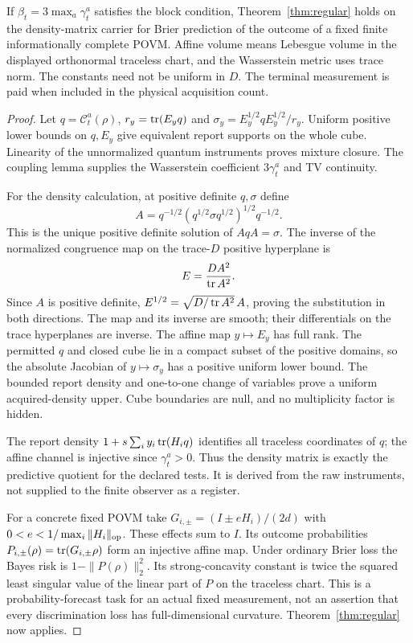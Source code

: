 \begin{theorem}\label{thm:quantum}
If $\beta_t=3\max_a\gamma_t^a$ satisfies the block condition, Theorem~\ref{thm:regular} holds on the density-matrix carrier for Brier prediction of the outcome of a fixed finite informationally complete POVM. Affine volume means Lebesgue volume in the displayed orthonormal traceless chart, and the Wasserstein metric uses trace norm. The constants need not be uniform in $D$. The terminal measurement is paid when included in the physical acquisition count.
\end{theorem}
\begin{proof}
Let $q=\mathcal C_t^a(\rho)$, $r_y=\operatorname{tr}(E_yq)$ and
$\sigma_y=E_y^{1/2}qE_y^{1/2}/r_y$. Uniform positive lower bounds on $q,E_y$ give equivalent report supports on the whole cube. Linearity of the unnormalized quantum instruments proves mixture closure. The coupling lemma supplies the Wasserstein coefficient $3\gamma_t^a$ and TV continuity.

For the density calculation, at positive definite $q,\sigma$ define
\[
 A=q^{-1/2}(q^{1/2}\sigma q^{1/2})^{1/2}q^{-1/2}.
\]
This is the unique positive definite solution of $AqA=\sigma$. The inverse of the normalized congruence map on the trace-$D$ positive hyperplane is
\begin{equation}\label{eq:quantum_inverse}
 E=\frac{DA^2}{\operatorname{tr} A^2}.
\end{equation}
Since $A$ is positive definite, $E^{1/2}=\sqrt{D/\operatorname{tr} A^2}\,A$, proving the substitution in both directions. The map and its inverse are smooth; their differentials on the trace hyperplanes are inverse. The affine map $y\mapsto E_y$ has full rank. The permitted $q$ and closed cube lie in a compact subset of the positive domains, so the absolute Jacobian of $y\mapsto\sigma_y$ has a positive uniform lower bound. The bounded report density and one-to-one change of variables prove a uniform acquired-density upper. Cube boundaries are null, and no multiplicity factor is hidden.

The report density $1+s\sum_i y_i\operatorname{tr}(H_iq)$ identifies all traceless coordinates of $q$; the affine channel is injective since $\gamma_t^a>0$. Thus the density matrix is exactly the predictive quotient for the declared tests. It is derived from the raw instruments, not supplied to the finite observer as a register.

For a concrete fixed POVM take
$G_{i,\pm}=(I\pm eH_i)/(2d)$ with
$0<e<1/\max_i\|H_i\|_{\rm op}$. These effects sum to $I$. Its outcome probabilities $P_{i,\pm}(\rho)=\operatorname{tr}(G_{i,\pm}\rho)$ form an injective affine map. Under ordinary Brier loss the Bayes risk is $1-\|P(\rho)\|_2^2$. Its strong-concavity constant is twice the squared least singular value of the linear part of $P$ on the traceless chart. This is a probability-forecast task for an actual fixed measurement, not an assertion that every discrimination loss has full-dimensional curvature. Theorem~\ref{thm:regular} now applies.
\end{proof}
